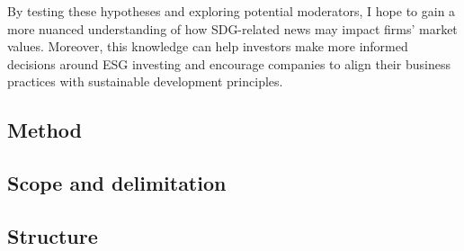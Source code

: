  
By testing these hypotheses and exploring potential moderators, I hope to gain a more nuanced understanding of how SDG-related news may impact firms' market values. Moreover, this knowledge can help investors make more informed decisions around ESG investing and encourage companies to align their business practices with sustainable development principles.









\subsection{Method}

\subsection{Scope and delimitation}

\subsection{Structure}
